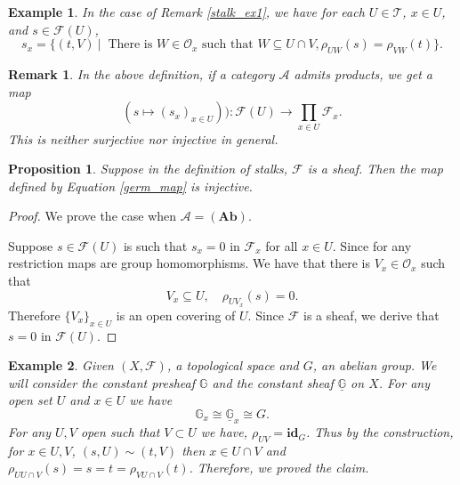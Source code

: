 \documentclass{article}
\newtheorem{proposition}{Proposition}[section]
\newtheorem{remark}{Remark}[section]
\newtheorem{example}{Example}[section]
\numberwithin{equation}{section}
\begin{document}
\begin{example}
In the case of Remark \ref{stalk_ex1}, we have for each $U\in\mathcal{T}$, $x\in U$, and $s\in\mathcal{F}(U)$,
\begin{equation*}
s_x = \{(t,V)\:|\: \text{ There is } W\in\mathcal{O}_x \text{ such that } W\subseteq U\cap V, \rho_{UW}(s)=\rho_{VW}(t)\}.
\end{equation*}
\end{example}

\begin{remark}
In the above definition, if a category $\mathcal{A}$ admits products, we get a map
\begin{equation}
\label{germ_map}
(s\mapsto (s_x)_{x\in U})):\mathcal{F}(U)\to\prod_{x\in U}\mathcal{F}_x.
\end{equation}
This is neither surjective nor injective in general.
\end{remark}

\begin{proposition}
\label{stalk_lifting}
Suppose in the definition of stalks, $\mathcal{F}$ is a sheaf. Then the map defined by Equation \ref{germ_map} is injective.
\end{proposition}

\begin{proof}
We prove the case when $\mathcal{A}=(\mathbf{Ab})$. \\
\par Suppose $s\in\mathcal{F}(U)$ is such that $s_x=0$ in $\mathcal{F}_x$ for all $x\in U$. Since for any restriction maps are group homomorphisms. We have that there is $V_x\in\mathcal{O}_x$ such that 
\begin{equation*}
V_x\subseteq U,\quad\rho_{UV_x}(s) = 0.
\end{equation*}
Therefore $\{V_x\}_{x\in U}$ is an open covering of $U$. Since $\mathcal{F}$ is a sheaf, we derive that $s=0$ in $\mathcal{F}(U)$.
\end{proof}

\begin{example}
Given $(X,\mathcal{F})$, a topological space and $G$, an abelian group. We will consider the constant presheaf $\mathbb{G}$ and the constant sheaf $\underline{\mathbb{G}}$ on $X$. For any open set $U$ and $x\in U$ we have
\begin{equation*}
\mathbb{G}_x\cong\underline{\mathbb{G}}_x\cong G.
\end{equation*}
For any $U,V$ open such that $V\subset U$ we have, $\rho_{UV}=\mathbf{id}_G$. Thus by the construction, for $x\in U,V$, $(s,U)\sim (t,V)$ then $x\in U\cap V$ and $\rho_{UU\cap V}(s) = s=t=\rho_{VU\cap V}(t)$. Therefore, we proved the claim.
\end{example}
\end{document}
